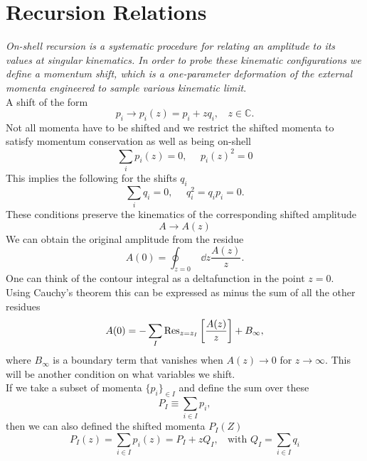 \documentclass[a4paper,12pt]{article}
\begin{document}
\section{Recursion Relations}\label{sec:recursion}
\textit{On-shell recursion is a systematic procedure for relating an amplitude to its
values at singular kinematics. In order to probe these kinematic configurations we define a momentum shift, which is a one-parameter deformation of
the external momenta engineered to sample various kinematic limit}. \\
%
%
A shift of the form
\begin{equation}
p_i\to p_i(z)=p_i+zq_i,~~~~z\in \mathds{C}.
\end{equation}
%
Not all momenta have to be shifted and we restrict the shifted momenta to satisfy momentum conservation as well as being on-shell
%
\begin{equation}
\sum_ip_i(z)=0,~~~~~~p_i(z)^2=0
\end{equation}
%
This implies the following for the shifts $q_i$
%
\begin{equation}
\sum_iq_i=0,~~~~~~q_i^2=q_ip_i=0.
\end{equation}
%
These conditions preserve the kinematics of the corresponding shifted amplitude
%
\begin{equation}
A\to A(z)
\end{equation}
%
We can obtain the original amplitude from the residue
%
\begin{equation}
A(0)=\oint_{z=0}\:\dd z \frac{A(z)}{z}.
\end{equation}
%
One can think of the contour integral as a deltafunction in the point $z=0$.\\
%
Using Cauchy's theorem this can be expressed as minus the sum of all the other residues 
%
\begin{equation}
A(0)=-\sum_I \Res_{z=z_I}\left[\frac{A(z)}{z}\right] +B_\infty,
\end{equation}
%
where $B_{\infty}$ is a boundary term that vanishes when $A(z)\to 0$ for $z\to \infty$. This will be another condition on what variables we shift. \\
%
If we take a subset of momenta $\{p_i\}_{\in I}$ and define the sum over these
%
\begin{equation}
P_I\equiv\sum_{i\in I} p_i,
\end{equation}
%
then we can also defined the shifted momenta $P_I(Z)$
%
\begin{equation}
P_I(z)=\sum_{i\in I} p_i(z)=P_I+zQ_I,~~~~\text{with } Q_I=\sum_{i\in I} q_i
\end{equation}
\end{document}
